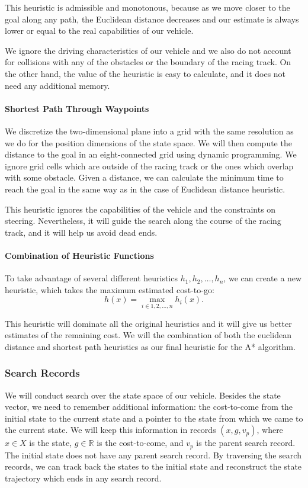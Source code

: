 This heuristic is admissible and monotonous, because as we move closer to the goal along any path, the Euclidean distance decreases and our estimate is always lower or equal to the real capabilities of our vehicle.

We ignore the driving characteristics of our vehicle and we also do not account for collisions with any of the obstacles or the boundary of the racing track. On the other hand, the value of the heuristic is easy to calculate, and it does not need any additional memory.

\paragraph{Shortest Path Through Waypoints}
We discretize the two-dimensional plane into a grid with the same resolution as we do for the position dimensions of the state space. We will then compute the distance to the goal in an eight-connected grid using dynamic programming. We ignore grid cells which are outside of the racing track or the ones which overlap with some obstacle. Given a distance, we can calculate the minimum time to reach the goal in the same way as in the case of Euclidean distance heuristic.

This heuristic ignores the capabilities of the vehicle and the constraints on steering. Nevertheless, it will guide the search along the course of the racing track, and it will help us avoid dead ends.

\paragraph{Combination of Heuristic Functions}
To take advantage of several different heuristics $h_1,h_2,\ldots ,h_n$, we can create a new heuristic, which takes the maximum estimated cost-to-go:
\[
h(x)=\max_{i \in {1, 2, \ldots, n}}h_i(x).
\]

This heuristic will dominate all the original heuristics and it will give us better estimates of the remaining cost. We will the combination of both the euclidean distance and shortest path heuristics as our final heuristic for the A* algorithm.

\subsubsection{Search Records}

We will conduct search over the state space of our vehicle. Besides the state vector, we need to remember additional information: the cost-to-come from the initial state to the current state and a pointer to the state from which we came to the current state. We will keep this information in records $\left(x, g, v_p\right)$, where $x\in X$ is the state, $g\in \mathbb{R}$ is the cost-to-come, and $v_p$ is the parent search record. The initial state does not have any parent search record. By traversing the search records, we can track back the states to the initial state and reconstruct the state trajectory which ends in any search record.

